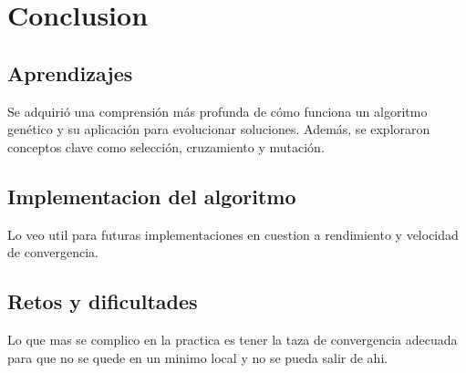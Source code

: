 \documentclass{article}
\begin{document}
\section{Conclusion}
\subsection{Aprendizajes}
Se adquirió una comprensión más profunda de cómo funciona un algoritmo genético y su aplicación para evolucionar soluciones. Además, se exploraron conceptos clave como selección, cruzamiento y mutación.
\subsection{Implementacion del algoritmo}
Lo veo util para futuras implementaciones en cuestion a rendimiento y velocidad de convergencia.
\subsection{Retos y dificultades}
Lo que mas se complico en la practica es tener la taza de convergencia adecuada para que no se quede en un minimo local y no se pueda salir de ahi.
\end{document}
